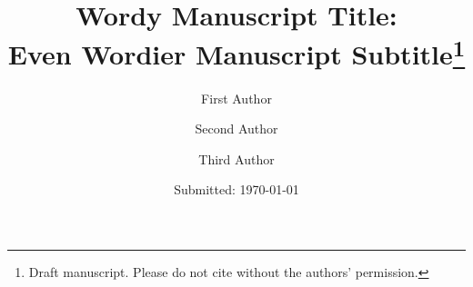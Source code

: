 
  \title{\vspace{-15mm}\fontsize{21pt}{10pt}\selectfont\textbf{Wordy Manuscript Title: \\Even Wordier Manuscript Subtitle\thanks{Draft manuscript. Please do not cite without the authors' permission.}}}

  \author[1]{\large First Author}
  \author[1]{\large Second Author}
  \author[2]{\large Third Author}
  \renewcommand\Authands{ and }

	\date{Submitted: \usvardate\today}